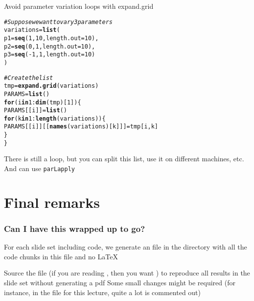\documentclass[aspectratio=169]{beamer}\usepackage[]{graphicx}\usepackage[]{xcolor}
\makeatletter
\newcommand{\hlnum}[1]{\textcolor[rgb]{0.686,0.059,0.569}{#1}}%
\newcommand{\hlcom}[1]{\textcolor[rgb]{0.678,0.584,0.686}{\textit{#1}}}%
\newcommand{\hlopt}[1]{\textcolor[rgb]{0,0,0}{#1}}%
\newcommand{\hldef}[1]{\textcolor[rgb]{0.345,0.345,0.345}{#1}}%
\newcommand{\hlkwa}[1]{\textcolor[rgb]{0.161,0.373,0.58}{\textbf{#1}}}%
\newcommand{\hlkwb}[1]{\textcolor[rgb]{0.69,0.353,0.396}{#1}}%
\newcommand{\hlkwc}[1]{\textcolor[rgb]{0.333,0.667,0.333}{#1}}%
\newcommand{\hlkwd}[1]{\textcolor[rgb]{0.737,0.353,0.396}{\textbf{#1}}}%
\newenvironment{kframe}{%
 \def\at@end@of@kframe{}%
 \ifinner\ifhmode%
  \def\at@end@of@kframe{\end{minipage}}%
  \begin{minipage}{\columnwidth}%
 \fi\fi%
 \def\FrameCommand##1{\hskip\@totalleftmargin \hskip-\fboxsep
 \colorbox{shadecolor}{##1}\hskip-\fboxsep
     \hskip-\linewidth \hskip-\@totalleftmargin \hskip\columnwidth}%
 \MakeFramed {\advance\hsize-\width
   \@totalleftmargin\z@ \linewidth\hsize
   \@setminipage}}%
 {\par\unskip\endMakeFramed%
 \at@end@of@kframe}
\newenvironment{knitrout}{}{} %
\makeatother
\begin{document}
\begin{frame}[fragile]{Avoid parameter variation loops with expand.grid}
\begin{knitrout}
\color{fgcolor}\begin{kframe}
\begin{alltt}
\hlcom{# Suppose we want to vary 3 parameters}
\hldef{variations} \hlkwb{=} \hlkwd{list}\hldef{(}
    \hlkwc{p1} \hldef{=} \hlkwd{seq}\hldef{(}\hlnum{1}\hldef{,} \hlnum{10}\hldef{,} \hlkwc{length.out} \hldef{=} \hlnum{10}\hldef{),}
    \hlkwc{p2} \hldef{=} \hlkwd{seq}\hldef{(}\hlnum{0}\hldef{,} \hlnum{1}\hldef{,} \hlkwc{length.out} \hldef{=} \hlnum{10}\hldef{),}
    \hlkwc{p3} \hldef{=} \hlkwd{seq}\hldef{(}\hlopt{-}\hlnum{1}\hldef{,} \hlnum{1}\hldef{,} \hlkwc{length.out} \hldef{=} \hlnum{10}\hldef{)}
\hldef{)}

\hlcom{# Create the list}
\hldef{tmp} \hlkwb{=} \hlkwd{expand.grid}\hldef{(variations)}
\hldef{PARAMS} \hlkwb{=} \hlkwd{list}\hldef{()}
\hlkwa{for} \hldef{(i} \hlkwa{in} \hlnum{1}\hlopt{:}\hlkwd{dim}\hldef{(tmp)[}\hlnum{1}\hldef{]) \{}
    \hldef{PARAMS[[i]]} \hlkwb{=} \hlkwd{list}\hldef{()}
    \hlkwa{for} \hldef{(k} \hlkwa{in} \hlnum{1}\hlopt{:}\hlkwd{length}\hldef{(variations)) \{}
        \hldef{PARAMS[[i]][[}\hlkwd{names}\hldef{(variations)[k]]]} \hlkwb{=} \hldef{tmp[i, k]}
    \hldef{\}}
\hldef{\}}
\end{alltt}
\end{kframe}
\end{knitrout}

There is still a loop, but you can split this list, use it on different machines, etc. And can use \texttt{parLapply}
\end{frame}


\section*{Final remarks}
\begin{frame}\frametitle{Can I have this wrapped up to go?}
For each slide set including  code, we generate an  file in the  directory with all the code chunks in this  file and no \LaTeX
\vfill

Source the file (if you are reading , then you want ) to reproduce all results in the slide set without generating a pdf
\vfill
Some small changes might be required (for instance, in the file for this lecture, quite a lot is commented out)
\end{frame}



\end{document}
